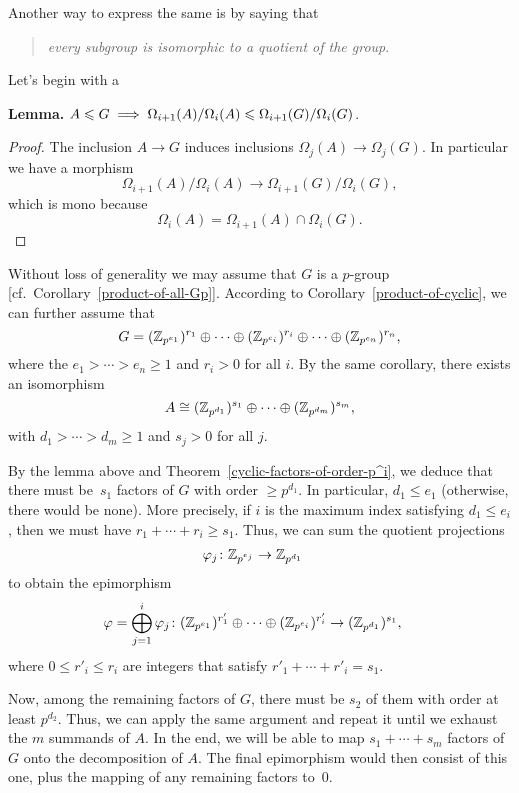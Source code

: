 \begin{solution} Another way to express the same is by saying that 

\begin{quote}
    \textit{every subgroup is isomorphic to a quotient of the group}.
\end{quote}
Let's begin with a 

\textbf{Lemma.} $A\leqslant G\implies
    \Omega_{i+1}(A)/\Omega_i(A)\leqslant\Omega_{i+1}(G)/\Omega_i(G)$.

{\small \begin{proof} The inclusion $A\to G$ induces inclusions $\Omega_j(A)\to\Omega_j(G)$. In particular we have a morphism
$$
    \Omega_{i+1}(A)/\Omega_i(A)\to\Omega_{i+1}(G)/\Omega_i(G),
$$
which is mono because
$$
    \Omega_i(A) = \Omega_{i+1}(A)\cap\Omega_i(G).
$$
 \end{proof}}

\medskip

Without loss of generality we may assume that $G$ is a $p$-group [cf.~Corollary~\ref{product-of-all-Gp}]. According to Corollary~\ref{product-of-cyclic}, we can further assume that
$$
    G=(\mathbb{Z}_{p^{e_1}})^{r_1}\oplus\cdots
        \oplus(\mathbb{Z}_{p^{e_i}})^{r_i}\oplus\cdots\oplus(\mathbb{Z}_{p^{e_n}})^{r_n},
$$
where the $e_1>\cdots>e_n\ge1$ and $r_i>0$ for all $i$. By the same corollary, there exists an isomorphism
$$
    A\cong(\mathbb{Z}_{p^{d_1}})^{s_1}\oplus\cdots\oplus(\mathbb{Z}_{p^{d_m}})^{s_m},
$$
with $d_1>\cdots>d_m\ge1$ and $s_j>0$ for all $j$.

By the lemma above and Theorem~\ref{cyclic-factors-of-order-p^i}, we deduce that there must be~$s_1$ factors of $G$ with order $\ge p^{d_1}$. In particular, $d_1\le e_1$ (otherwise, there would be none). More precisely, if $i$ is the maximum index satisfying $d_1\le e_i$, then we must have $r_1+\cdots+r_i\ge s_1$. Thus, we can sum the quotient projections
\begin{align*}
    \varphi_j\colon\mathbb{Z}_{p^{e_j}}&\to\mathbb{Z}_{p^{d_1}}
\end{align*}
to obtain the epimorphism
\begin{align*}
    \varphi=\bigoplus_{j=1}^i\varphi_j\colon
        (\mathbb{Z}_{p^{e_1}})^{r'_1}\oplus\cdots
            \oplus(\mathbb{Z}_{p^{e_i}})^{r'_i}
        &\to(\mathbb{Z}_{p^{d_1}})^{s_1},
\end{align*}
where $0\le r'_i\le r_i$ are integers that satisfy $r'_1+\cdots+r'_i=s_1$.

Now, among the remaining factors of $G$, there must be $s_2$ of them with order at least $p^{d_2}$. Thus, we can apply the same argument and repeat it until we exhaust the $m$ summands of $A$. In the end, we will be able to map $s_1+\cdots+s_m$ factors of $G$ onto the decomposition of $A$. The final epimorphism would then consist of this one, plus the mapping of any remaining factors to~$0$.  \end{solution}

